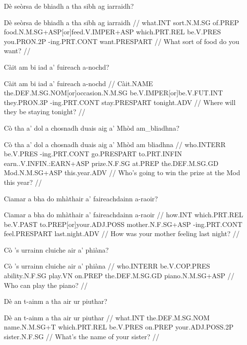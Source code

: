 \documentclass[a4paper,10pt]{article}
\begin{document}
\ex
\begingl
\glpre Dè seòrsa de bhiadh a tha sibh ag iarraidh? 

\vspace{4mm}
\gla Dè seòrsa de bhiadh a tha sibh ag iarraidh  //
\glb what.INT sort.N.M.SG of.PREP food.N.M.SG+ASP[or]feed.V.IMPER+ASP which.PRT.REL be.V.PRES you.PRON.2P -ing.PRT.CONT want.PRESPART  //
\glft What sort of food do you want? //
\endgl
\xe

\ex
\begingl
\glpre Càit am bi iad a' fuireach a-nochd? 

\vspace{4mm}
\gla Càit am bi iad a' fuireach a-nochd  //
\glb Càit.NAME the.DEF.M.SG.NOM[or]occasion.N.M.SG be.V.IMPER[or]be.V.FUT.INT they.PRON.3P -ing.PRT.CONT stay.PRESPART tonight.ADV  //
\glft Where will they be staying tonight? //
\endgl
\xe

\ex
\begingl
\glpre Cò tha a' dol a chosnadh duais aig a' Mhòd am\_bliadhna? 

\vspace{4mm}
\gla Cò tha a' dol a chosnadh duais aig a' Mhòd {am bliadhna}  //
\glb who.INTERR be.V.PRES -ing.PRT.CONT go.PRESPART to.PRT.INFIN earn..V.INFIN.:EARN+ASP prize.N.F.SG at.PREP the.DEF.M.SG.GD Mod.N.M.SG+ASP this.year.ADV  //
\glft Who's going to win the prize at the Mod this year? //
\endgl
\xe

\ex
\begingl
\glpre Ciamar a bha do mhàthair a' faireachdainn a-raoir? 

\vspace{4mm}
\gla Ciamar a bha do mhàthair a' faireachdainn a-raoir  //
\glb how.INT which.PRT.REL be.V.PAST to.PREP[or]your.ADJ.POSS mother.N.F.SG+ASP -ing.PRT.CONT feel.PRESPART last.night.ADV  //
\glft How was your mother feeling last night? //
\endgl
\xe

\ex
\begingl
\glpre Cò 's urrainn cluiche air a' phiàna? 

\vspace{4mm}
\gla Cò 's urrainn cluiche air a' phiàna  //
\glb who.INTERR be.V.COP.PRES ability.N.F.SG play.VN on.PREP the.DEF.M.SG.GD piano.N.M.SG+ASP  //
\glft Who can play the piano? //
\endgl
\xe

\ex
\begingl
\glpre Dè an t-ainm a tha air ur piuthar? 

\vspace{4mm}
\gla Dè an t-ainm a tha air ur piuthar  //
\glb what.INT the.DEF.M.SG.NOM name.N.M.SG+T which.PRT.REL be.V.PRES on.PREP your.ADJ.POSS.2P sister.N.F.SG  //
\glft What's the name of your sister? //
\endgl
\xe
\end{document}
